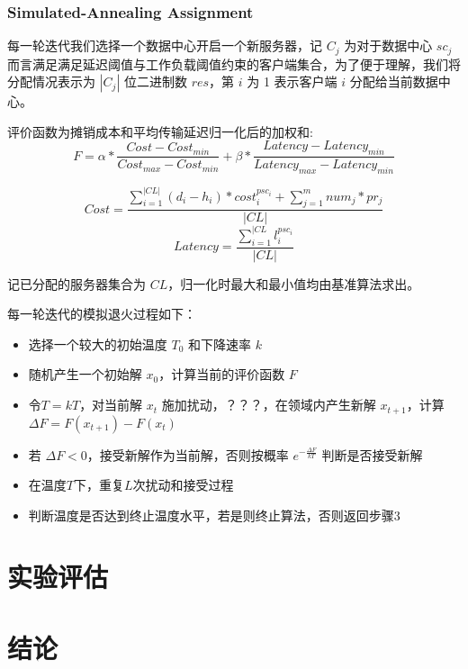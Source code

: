 \subsection{Simulated-Annealing Assignment}
每一轮迭代我们选择一个数据中心开启一个新服务器，记 $C_j$ 为对于数据中心 $sc_j$
而言满足满足延迟阈值与工作负载阈值约束的客户端集合，为了便于理解，我们将分配情况表示为 $|C_j|$
位二进制数 $res$，第 $i$ 为 1 表示客户端 $i$ 分配给当前数据中心。

评价函数为摊销成本和平均传输延迟归一化后的加权和:
$$ F = \alpha*{\frac{Cost - Cost_{min}}{Cost_{max}-Cost_{min}}}
    +\beta*{\frac{Latency-Latency_{min}}{Latency_{max}-Latency_{min}}} $$

$$ Cost = \frac{\sum\limits_{i=1}^{|CL|}{(d_i-h_i)*cost_i^{psc_i}} + \sum\limits_{j=1}^m{num_j}*pr_j}{|CL|} $$
$$ Latency = \frac{\sum\limits_{i=1}^{|CL}{l_i^{psc_i}}}{|CL|} $$

记已分配的服务器集合为 $CL$，归一化时最大和最小值均由基准算法求出。

每一轮迭代的模拟退火过程如下：

\begin{itemize}
    \item 选择一个较大的初始温度 $T_0$ 和下降速率 $k$
    \item 随机产生一个初始解 $ x_0 $，计算当前的评价函数 $F$
    \item 令$T=kT$，对当前解 $x_t$ 施加扰动，？？？，在领域内产生新解 $x_{t+1}$，计算 $\Delta F = F(x_{t+1})-F(x_t)$
    \item 若 $\Delta F < 0$，接受新解作为当前解，否则按概率 $e^{-\frac{\Delta F}{kT}}$ 判断是否接受新解
    \item 在温度$T$下，重复$L$次扰动和接受过程
    \item 判断温度是否达到终止温度水平，若是则终止算法，否则返回步骤3
\end{itemize}

\chapter{实验评估}

\chapter{结论}
